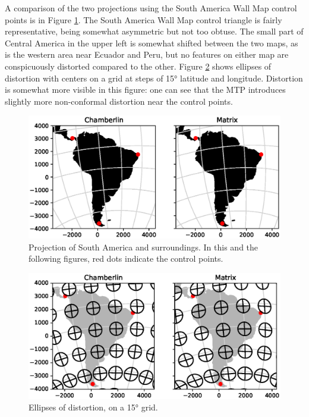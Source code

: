 \documentclass[]{interact}
\begin{document}
A comparison of the two projections using the South America Wall Map control
points is in Figure \ref{fig:proj}.
The South America Wall Map control triangle is fairly
representative, being somewhat asymmetric but not too obtuse. The small part of
Central America in the upper left is somewhat shifted between the two maps, as
is the western area near Ecuador and Peru, but no features on either map are
conspicuously distorted compared to the other. Figure \ref{fig:tissot} shows
ellipses of distortion with centers on a grid at steps of 15° latitude and
longitude.
Distortion is somewhat more visible in this figure: one can see that the
MTP introduces slightly more non-conformal distortion near the control points.

\begin{figure}
  \includegraphics[width=\textwidth]{South_America_Wall_Map_zoom}
  \caption{Projection of South America and surroundings. In this and the
  following figures, red dots indicate the control points.}
  \label{fig:proj}
\end{figure}

\begin{figure}
  \includegraphics[width=\textwidth]{South_America_Wall_Map_tissot}
  \caption{Ellipses of distortion, on a 15° grid.}
  \label{fig:tissot}
\end{figure}
\end{document}
